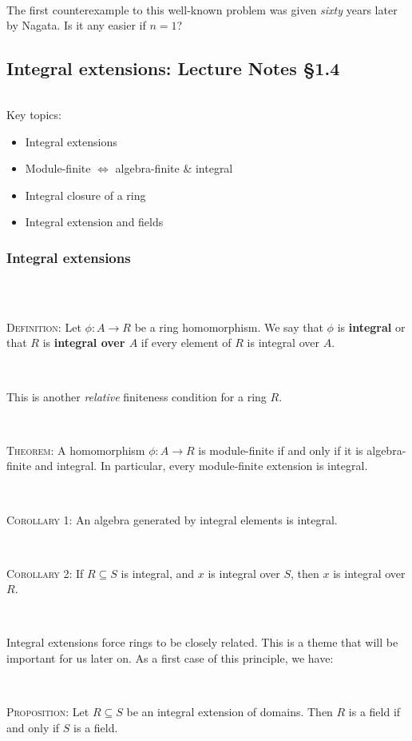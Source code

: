 \documentclass[12pt]{amsart}
\newcommand{\0}{$\phantom{.}$}
\newcommand{\1}{\mathbbm{1}}
\newcommand{\sssec}[1]{\subsubsection*{#1}}
\begin{document}
\

\noindent The first counterexample to this well-known problem was given \emph{sixty} years later by Nagata. Is it any easier if $n=1$?




\newpage
\subsection{Integral extensions: Lecture Notes \S1.4} \0

\begin{framed} Key topics:
\begin{itemize}
\item Integral extensions
\item Module-finite $\Longleftrightarrow$ algebra-finite \& integral
\item Integral closure of a ring
\item Integral extension and fields
\end{itemize}
\end{framed}


\sssec{Integral extensions} \0 

\

\noindent \textsc{Definition:} Let $\phi: A\to R$ be a ring homomorphism. We say that $\phi$ is \textbf{integral} or that $R$ is \textbf{integral over $A$} if every element of $R$ is integral over $A$.

\

\noindent This is another \emph{relative} finiteness condition for a ring $R$.

\

\noindent \textsc{Theorem:} A homomorphism $\phi: A \to R$ is module-finite if and only if it is algebra-finite and integral. In particular, every module-finite extension is integral.

\

\noindent \textsc{Corollary 1:} An algebra generated by integral elements is integral. 

\

\noindent \textsc{Corollary 2:} If $R\subseteq S$ is integral, and $x$ is integral over $S$, then $x$ is integral over $R$.

\

\noindent Integral extensions force rings to be closely related. This is a theme that will be important for us later on. As a first case of this principle, we have:

\

\noindent \textsc{Proposition:} Let $R\subseteq S$ be an integral extension of domains. Then $R$ is a field if and only if $S$ is a field.
\end{document}
